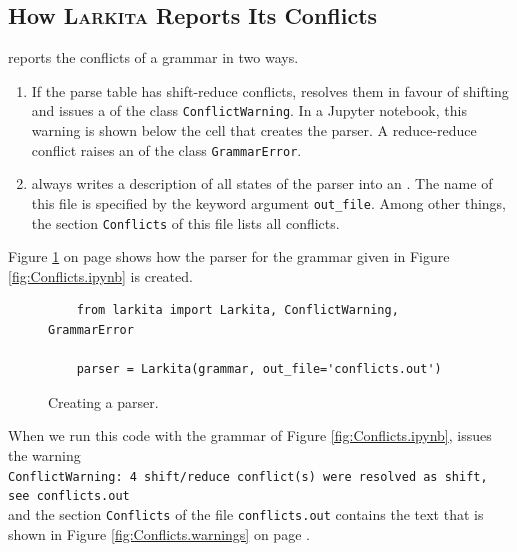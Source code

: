 \subsection{How \textsc{Larkita} Reports Its Conflicts}
 reports the conflicts of a grammar in two ways.
\begin{enumerate}
\item If the parse table has shift-reduce conflicts,  resolves them in favour of shifting and
      issues a  of the class \texttt{ConflictWarning}.  In a Jupyter notebook, this warning is
      shown below the cell that creates the parser.  A reduce-reduce conflict raises an  of the
      class \texttt{GrammarError}.
\item {} always writes a description of all states of the parser into an .  The name of this file is specified by
      the keyword argument \texttt{out\_file}.  Among other things, the section \texttt{Conflicts} of this file
      lists all conflicts.
\end{enumerate}
Figure \ref{fig:conflicts-code} on page \pageref{fig:conflicts-code} shows how the parser for the grammar given
in Figure \ref{fig:Conflicts.ipynb} is created.

\begin{figure}[!ht]
\centering
\begin{verbatim}
    from larkita import Larkita, ConflictWarning, GrammarError

    parser = Larkita(grammar, out_file='conflicts.out')
\end{verbatim}
\vspace*{-0.3cm}
\caption{Creating a parser.}
\label{fig:conflicts-code}
\end{figure}
\FloatBarrier

\noindent
When we run this code with the grammar of Figure \ref{fig:Conflicts.ipynb},  issues the
warning
\\[0.2cm]
\hspace*{1.3cm}
\texttt{ConflictWarning: 4 shift/reduce conflict(s) were resolved as shift, see conflicts.out}
\\[0.2cm]
and the section \texttt{Conflicts} of the file \texttt{conflicts.out} contains the text that is shown in Figure
\ref{fig:Conflicts.warnings} on page \pageref{fig:Conflicts.warnings}.


